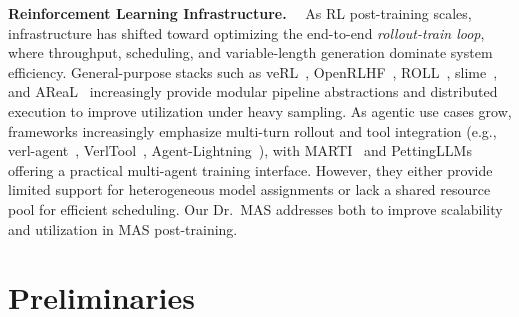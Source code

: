 \documentclass[]{fairmeta}
\theoremstyle{plain}
\theoremstyle{definition}
\theoremstyle{remark}
\newcommand{\methodname}{Dr.\ MAS}
\begin{document}
\textbf{Reinforcement Learning Infrastructure.}~~
As RL post-training scales, infrastructure has shifted toward optimizing the end-to-end \emph{rollout-train loop}, where throughput, scheduling, and variable-length generation dominate system efficiency. General-purpose stacks such as veRL~\citep{sheng2024hybridflow}, OpenRLHF~\citep{hu2024openrlhf}, ROLL~\citep{wang2025reinforcement}, slime~\citep{slime_github}, and AReaL~\citep{fu2025areal} increasingly provide modular pipeline abstractions and distributed execution to improve utilization under heavy sampling. As agentic use cases grow, frameworks increasingly emphasize multi-turn rollout and tool integration (e.g., verl-agent~\citep{feng2025group}, VerlTool~\citep{jiang2025verltool}, Agent-Lightning~\citep{luo2025agent}), with MARTI~\citep{marti2025} and PettingLLMs~\citep{zhao2025stronger} offering a practical multi-agent training interface. However, they either provide limited support for heterogeneous model assignments or lack a shared resource pool for efficient scheduling. Our \methodname{} addresses both to improve scalability and utilization in MAS post-training.

\section{Preliminaries}
\label{sec:background}
\end{document}

